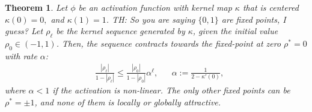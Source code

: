 \documentclass[twoside]{article}
\newtheorem{theorem}{Theorem}
\newtheorem{remark}{Remark}
\theoremstyle{definition}
\newcommand{\thomas}[1]{{\color{blue}TH:  \textit{#1}}}
\begin{document}
\begin{theorem}\label{thm:global_attract_centered}
Let $\phi$ be an activation function with kernel map $\kappa$ that is centered $\kappa(0)=0,$ and $\kappa(1)=1$. \thomas{So you are saying $\{0,1\}$ are fixed points, I guess?} Let $\rho_\ell$ be the kernel sequence generated by $\kappa$, given the initial value $\rho_0 \in(-1 , 1)$.
Then, the sequence contracts towards the fixed-point at zero $\rho^*=0$ with rate $\alpha$:
    \begin{align}
        &\frac{|\rho_\ell|}{1-|\rho_\ell|} \le \frac{|\rho_0|}{1-|\rho_0|}\alpha^{\ell}, && \alpha := \frac{1}{2-\kappa'(0)},
    \end{align}
 where $\alpha<1$ if the activation is non-linear. The only other fixed points can be $\rho^*=\pm 1$, and none of them is locally or globally attractive.
\end{theorem}


\end{document}
